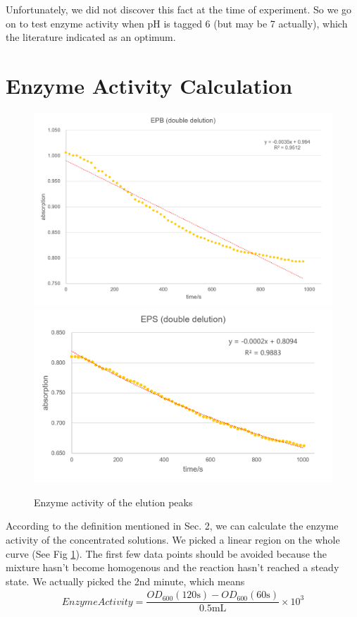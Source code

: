 Unfortunately, we did not discover this fact at the time of experiment. So we go on to test enzyme activity when pH is tagged 6 (but may be 7 actually), which the literature indicated as an optimum.

\section{Enzyme Activity Calculation}

\begin{figure}[!h]
	\centering
	\includegraphics[width=0.9\linewidth]{figures/chp3_EPBcur}
	\includegraphics[width=0.9\linewidth]{figures/chp3_EPScur}
	\caption{Enzyme activity of the elution peaks}
	\label{fig:epbs}
\end{figure}


According to the definition mentioned in Sec. 2, we can calculate the enzyme activity of the concentrated solutions. We picked a linear region on the whole curve (See Fig \ref{fig:epbs}). The first few data points should be avoided because the mixture hasn't become homogenous and the reaction hasn't reached a steady state. We actually picked the 2nd minute, which means
\begin{gather*}
	EnzymeActivity=\dfrac{OD_{600}(120\mathrm{s})-OD_{600}(60\mathrm{s})}{0.5\mathrm{mL}}\times 10^{3}
\end{gather*}

